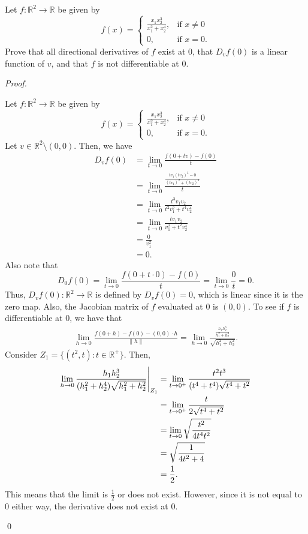 \documentclass[12pt]{article}
\newenvironment{problem}[2][Problem]{\begin{trivlist}
\item[\hskip \labelsep {\bfseries #1}\hskip \labelsep {\bfseries
#2.}]}{\end{trivlist}}
\newenvironment{sol}
    {\emph{Proof.}
    }
    {
    \qed
    }
\newcommand\restr[2]{{%
  \left.\kern-\nulldelimiterspace %
  #1 %
  \vphantom{\big|} %
  \right|_{#2} %
  }}
\begin{document}
  \begin{problem}{7}
  Let $f: \mathbb{R}^2 \to \mathbb{R}$ be given by $$f(x) = \begin{cases} 
       \frac{x_1 x_2^3}{x_1^2 + x_2^4}, & \text{if } x \neq 0 \\
        0, & \text{if } x = 0. 
     \end{cases}
  $$ Prove that all directional derivatives of $f$ exist at 0, that $D_vf(0)$ is a linear function of $v$, and that $f$ is not differentiable at 0.
  \end{problem}
  \begin{sol}
  Let $f: \mathbb{R}^2 \to \mathbb{R}$ be given by $$f(x) = \begin{cases} 
       \frac{x_1 x_2^3}{x_1^2 + x_2^4}, & \text{if } x \neq 0 \\
        0, & \text{if } x = 0. 
     \end{cases}
  $$ Let $v \in \mathbb{R}^2 \setminus (0, 0)$. Then, we have \begin{align*}
      D_vf(0) &= \lim_{t \to 0} \frac{f(0 + tv) - f(0)}{t} \\ &= \lim_{t \to 0} \frac{\frac{tv_1(tv_2)^3- 0}{(tv_1)^2 + (tv_2)^4}}{t} \tag*{(Definition of $f$)} \\ &= \lim_{t \to 0} \frac{t^3v_1v_2}{t^2v_1^2 + t^4v_2^4} \\ &= \lim_{t \to 0} \frac{tv_1v_2}{v_1^2 + t^2v_2^4} \\ &= \frac{0}{v_1^2} \\ &= 0.
  \end{align*}
  Also note that $$
      D_0f(0) = \lim_{t \to 0} \frac{f(0 + t \cdot 0) - f(0)}{t} = \lim_{t \to 0} \frac{0}{t} = 0.$$ Thus, $D_vf(0):\mathbb{R}^2 \to \mathbb{R}$ is defined by $D_vf(0) = 0$, which is linear since it is the zero map. Also, the Jacobian matrix of $f$ evaluated at $0$ is $(0, 0)$. To see if $f$ is differentiable at $0$, we have that \begin{align*}
          \lim_{h \to 0} \frac{f(0 + h) - f(0) - (0, 0)\cdot h}{\lVert h \rVert} = \lim_{h \to 0} \frac{\frac{h_1h_2^3}{h_1^2 + h_2^4}}{\sqrt{h_1^2 + h_2^2}}.
      \end{align*}
      Consider $Z_1 = \{(t^2, t) : t \in \mathbb{R}^+\}$. Then, \begin{align*}
          \lim_{h \to 0} \restr{\frac{h_1h_2^3}{(h_1^2 + h_2^4)\sqrt{h_1^2 + h_2^2}}}{Z_1} &= \lim_{t \to 0^+} \frac{t^2t^3}{(t^4 + t^4)\sqrt{t^4 + t^2}} \\ &= \lim_{t \to 0^+} \frac{t}{2\sqrt{t^4 + t^2}} \\ &= \lim_{t \to 0} \sqrt{\frac{t^2}{4t^4t^2}} \\ &= \sqrt{\frac{1}{4t^2 + 4}} \\ &= \frac{1}{2}.
      \end{align*}
      This means that the limit is $\frac{1}{2}$ or does not exist. However, since it is not equal to 0 either way, the derivative does not exist at 0.
  \end{sol}
  
\end{document}
